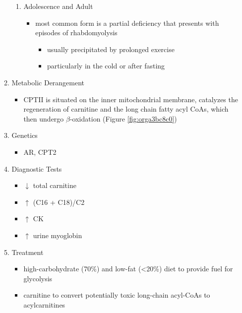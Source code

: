 \documentclass{scrartcl}
\begin{document}
\begin{enumerate}
\begin{enumerate}
\begin{enumerate}
\item Adolescence and Adult
\label{sec:orge9f2cde}
\begin{itemize}
\item most common form is a partial deficiency that presents with
episodes of rhabdomyolysis
\begin{itemize}
\item usually precipitated by prolonged exercise
\item particularly in the cold or after fasting
\end{itemize}
\end{itemize}
\end{enumerate}

\item Metabolic Derangement
\label{sec:orga1ac1bb}
\begin{itemize}
\item CPTII is situated on the inner mitochondrial membrane, catalyzes the
regeneration of carnitine and the long chain fatty acyl CoAs, which
then undergo \(\beta\)-oxidation (Figure \ref{fig:orga3bc8c0})
\end{itemize}
\item Genetics
\label{sec:orgfbfe135}
\begin{itemize}
\item AR, CPT2
\end{itemize}
\item Diagnostic Tests
\label{sec:org645c0ec}
\begin{itemize}
\item \(\downarrow\) total carnitine
\item \(\uparrow\) (C16 + C18)/C2
\item \(\uparrow\) CK
\item \(\uparrow\) urine myoglobin
\end{itemize}
\item Treatment
\label{sec:orgd187a4b}
\begin{itemize}
\item high-carbohydrate (70\%) and low-fat (<20\%) diet to provide fuel for glycolysis
\item carnitine to convert potentially toxic long-chain acyl-CoAs to
acylcarnitines
\end{itemize}
\end{enumerate}
\end{enumerate}
\end{document}
